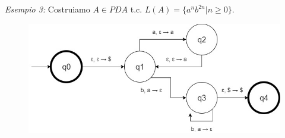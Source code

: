 \begin{description}
\begin{figure}[H]
	\end{figure}
	\item \textit{Esempio 3:} Costruiamo $A \in PDA$ t.c. $L(A) =\{ a^nb^{2n} | n \geq 0\}$.
	\begin{figure}[H]
	\includegraphics[scale=0.5]{p3}
	\end{figure}
\end{description}
